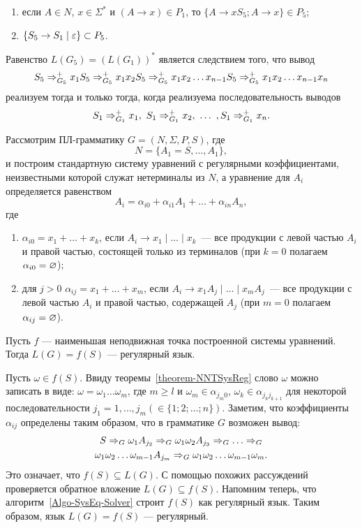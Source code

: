 \begin{myproof}
\begin{enumerate}
\begin{enumerate}[label=(\emph{\roman*})]
	\item если $A\in N$, $x\in\Sigma^*$ и $(A\to x)\in P_1$, то $\{A\to xS_5;A\to x\}\in P_5$;

	\item $\{S_5\to S_1\mid\varepsilon\}\subset P_5$.
\end{enumerate}
Равенство $L(G_5)=(L(G_1))^*$ является следствием того, что вывод
\[
S_5 \Rightarrow_{G_5}^+ x_1S_5 \Rightarrow_{G_5}^+ x_1x_2S_5 \Rightarrow_{G_5}^+ x_1x_2\ldots x_{n-1}S_5 \Rightarrow_{G_5}^+ x_1x_2\ldots x_{n-1}x_n
\]
реализуем тогда и только тогда, когда реализуема последовательность выводов
\[
S_1 \Rightarrow_{G_1}^+ x_1,~ S_1 \Rightarrow_{G_1}^+x_2,~\ldots ~, S_1 \Rightarrow_{G_1}^+ x_n.
\]
\end{enumerate}
\end{myproof}

\begin{mylemma}
\label{lemma-PL-reg-lang}
Рассмотрим ПЛ-грамматику $G=(N,\Sigma,P,S)$, где
\[
    N=\{A_1=S,\ldots ,A_1\},
\]
и построим стандартную систему уравнений с регулярными коэффициентами, неизвестными которой служат нетерминалы из $N$, а уравнение для $A_i$ определяется равенством
\[
A_i=\alpha_{i0}+\alpha_{i1}A_1+ \ldots +\alpha_{in}A_n,
\]
где
\begin{enumerate}
    \item $\alpha_{i0} = x_1 + \ldots + x_k$, если $A_i \to x_1 \mid \ldots
    \mid x_k$~--- все продукции с левой частью $A_i$ и правой частью,
    состоящей только из терминалов (при $k=0$ полагаем
    $\alpha_{i0}=\varnothing$);

    \item для $j>0$ $\alpha_{ij} = x_1 + \ldots + x_m$, если
    $A_i \to x_1A_j \mid \ldots  \mid x_mA_j$~--- все продукции с
    левой частью $A_i$ и правой частью, содержащей $A_j$
    (при $m=0$ полагаем $\alpha_{ij}=\varnothing$).
\end{enumerate}

Пусть $f$ --- наименьшая неподвижная точка построенной системы уравнений. Тогда $L(G)=f(S)$ --- регулярный язык.
\end{mylemma}

\begin{myproof}
Пусть $\omega\in f(S)$. Ввиду теоремы~\ref{theorem-NNTSysReg} слово $\omega$ можно записать в виде: $\omega=\omega_1\ldots \omega_m$, где $m\ge l$ и $\omega_m\in\alpha_{j_m0}$, $\omega_k\in\alpha_{j_kj_{k+1}}$ для некоторой последовательности $j_1=1, \ldots , j_m (\in\{1;2;\ldots ;n\})$. Заметим, что коэффициенты $\alpha_{ij}$ определены таким образом, что в грамматике $G$ возможен вывод:
\begin{multline*}
    S \Rightarrow_G 
    \omega_1A_{j_2} \Rightarrow_G 
    \omega_1\omega_2A_{j_3} \Rightarrow_G 
    \ldots \Rightarrow_G \\
    \omega_1\omega_2\ldots \omega_{m-1}A_{j_m} \Rightarrow_G 
    \omega_1\omega_2\ldots \omega_{m-1}\omega_m.
\end{multline*}
Это означает, что $f(S)\subseteq L(G)$. С помощью похожих рассуждений проверяется обратное вложение $L(G)\subseteq f(S)$. Напомним теперь, что алгоритм~\ref{Algo-SysEq-Solver} строит $f(S)$ как регулярный язык. Таким образом, язык $L(G)=f(S)$ --- регулярный.
\end{myproof}

